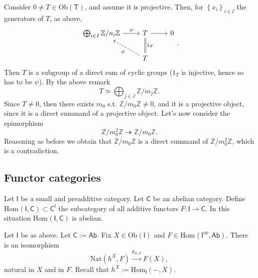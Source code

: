 \begin{ex}
\begin{itemize}
			Consider $0 \neq T \in \mathrm{Ob} \left(\mathsf{T}\right)$,
			and assume it is projective.
			Then, for $\left\{ x_i \right\}_{i \in I}$ the generators of $T$, as above,
			\begin{equation}
			\begin{tikzcd}
				\bigoplus_{i \in I} \mathbb{Z}/n_i\mathbb{Z} \arrow[r, "\varphi", rightarrow] &
				T \arrow[r, "", rightarrow] &
				0 \\
				&
				T \arrow[ul, "\psi", dashrightarrow] \arrow[u, "1_T"', equals] &
			\end{tikzcd}
			.\end{equation} 
			Then $T$ is a subgroup of a direct sum of cyclic groups
			($1_T$ is injective, hence so has to be $\psi$).
			By the above remark
			\begin{equation}
			T \simeq \bigoplus_{j \in J} \mathbb{Z}/m_j\mathbb{Z}
			.\end{equation} 
			Since $T \neq 0$, then there exists $m_0$ s.t.
			$\mathbb{Z}/m_0\mathbb{Z} \neq 0$, and it is a projective object, since
			it is a direct summand of a projective object.
			Let's now consider the epimorphism
			\begin{equation}
			\mathbb{Z}/m_0^2\mathbb{Z} \twoheadrightarrow \mathbb{Z}/m_0\mathbb{Z}
			.\end{equation} 
			Reasoning as before we obtain that $\mathbb{Z}/m_0\mathbb{Z}$ is a direct
			summand of $\mathbb{Z}/m_0^2\mathbb{Z}$, which is a contradiction.
	\end{itemize}
\end{ex} 

\subsection{Functor categories}
\begin{rem}
	Let $\mathsf{I}$ be a small and preadditive category.
	Let $\mathsf{C}$ be an abelian category.
	Define $\mathrm{Hom}_{\mathsf{}} \left( \mathsf{I}, \mathsf{C} \right) \subset \mathsf{C}^{\mathsf{I}}$
	the subcategory of all additive functors $F: \mathsf{I} \to \mathsf{C}$.
	In this situation $\mathrm{Hom}_{\mathsf{}} \left( \mathsf{I}, \mathsf{C} \right)$ is abelian.
\end{rem}

\begin{lem}[Yoneda]
	Let $\mathsf{I}$ be as above.
	Let $\mathsf{C} := \mathsf{Ab}$.
	Fix $X \in \mathrm{Ob} \left(\mathsf{I}\right)$ and $F \in \mathrm{Hom}_{\mathsf{}} \left( \mathsf{I}^{op}, \mathsf{Ab} \right)$.
	There is an isomorphism
	\begin{equation}
	\mathrm{Nat} \left( h^X, F \right) \xrightarrow{\theta_{X,F}} 
	F(X)
	,\end{equation} 
	natural in $X$ and in $F$.
	Recall that $h^X := \mathrm{Hom}_{\mathsf{I}} \left( -, X \right)$.
\end{lem} 

